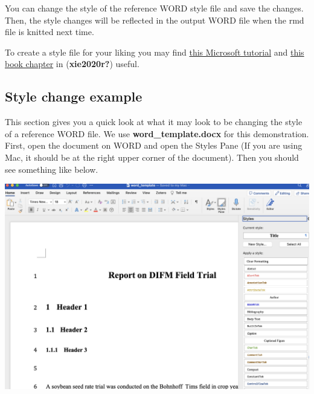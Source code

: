 \documentclass[
  letterpaper,
  DIV=11,
  numbers=noendperiod]{scrreprt}
\begin{document}
You can change the style of the reference WORD style file and save the
changes. Then, the style changes will be reflected in the output WORD
file when the rmd file is knitted next time.

\begin{tcolorbox}[enhanced jigsaw, colframe=quarto-callout-tip-color-frame, toptitle=1mm, colbacktitle=quarto-callout-tip-color!10!white, toprule=.15mm, colback=white, arc=.35mm, bottomtitle=1mm, opacitybacktitle=0.6, breakable, left=2mm, coltitle=black, leftrule=.75mm, title=\textcolor{quarto-callout-tip-color}{\faLightbulb}\hspace{0.5em}{Tip}, rightrule=.15mm, titlerule=0mm, opacityback=0, bottomrule=.15mm]

To create a style file for your liking you may find
\href{https://support.microsoft.com/en-gb/office/customize-or-create-new-styles-d38d6e47-f6fc-48eb-a607-1eb120dec563}{this
Microsoft tutorial} and
\href{https://bookdown.org/yihui/Rmarkdown-cookbook/word-template.html}{this
book chapter} in (\textbf{xie2020r?}) useful.

\end{tcolorbox}

\hypertarget{style-change-example}{%
\subsection{Style change example}\label{style-change-example}}

This section gives you a quick look at what it may look to be changing
the style of a reference WORD file. We use \textbf{word\_template.docx}
for this demonstration. First, open the document on WORD and open the
Styles Pane (If you are using Mac, it should be at the right upper
corner of the document). Then you should see something like below.

\includegraphics[width=1\textwidth,height=\textheight]{assets/pictures/style-change-1.png}
\end{document}

